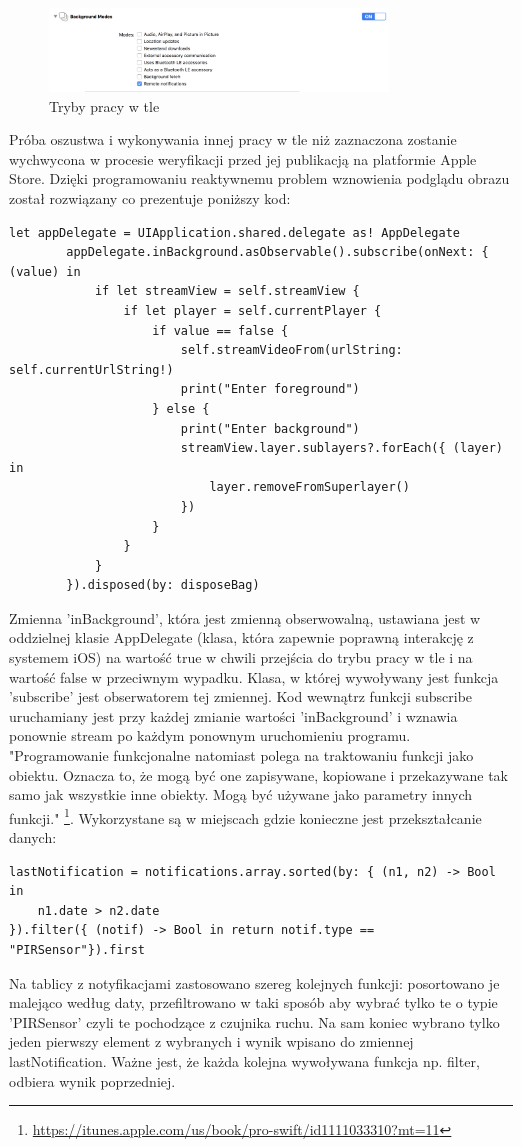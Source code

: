 \begin{figure}[ht]
	\centering
	\includegraphics[width=9cm]{ios_screenshots/backgroundModes.png}
	\caption{Tryby pracy w tle}
\end{figure}
Próba oszustwa i wykonywania innej pracy w tle niż zaznaczona zostanie wychwycona w procesie weryfikacji przed jej publikacją na platformie Apple Store. Dzięki programowaniu reaktywnemu problem wznowienia podglądu obrazu został rozwiązany co prezentuje poniższy kod:
\begin{verbatim}
let appDelegate = UIApplication.shared.delegate as! AppDelegate
        appDelegate.inBackground.asObservable().subscribe(onNext: { (value) in
            if let streamView = self.streamView {
                if let player = self.currentPlayer {
                    if value == false {
                        self.streamVideoFrom(urlString: self.currentUrlString!)
                        print("Enter foreground")
                    } else {
                        print("Enter background")
                        streamView.layer.sublayers?.forEach({ (layer) in
                            layer.removeFromSuperlayer()
                        })
                    }
                }
            }
        }).disposed(by: disposeBag)
\end{verbatim}
Zmienna 'inBackground', która jest zmienną obserwowalną, ustawiana jest w oddzielnej klasie AppDelegate (klasa, która zapewnie poprawną interakcję z systemem iOS) na wartość true w chwili przejścia do trybu pracy w tle i na wartość false w przeciwnym wypadku. Klasa, w której wywoływany jest funkcja 'subscribe' jest obserwatorem tej zmiennej. Kod wewnątrz funkcji subscribe uruchamiany jest przy każdej zmianie wartości 'inBackground' i wznawia ponownie stream po każdym ponownym uruchomieniu programu.
"Programowanie funkcjonalne natomiast polega na traktowaniu funkcji jako obiektu. Oznacza to, że mogą być one zapisywane, kopiowane i przekazywane tak samo jak wszystkie inne obiekty. Mogą być używane jako parametry innych funkcji." \footnote{\url{https://itunes.apple.com/us/book/pro-swift/id1111033310?mt=11}}. Wykorzystane są w miejscach gdzie konieczne jest przekształcanie danych:
\begin{verbatim}
lastNotification = notifications.array.sorted(by: { (n1, n2) -> Bool in
	n1.date > n2.date 
}).filter({ (notif) -> Bool in return notif.type == "PIRSensor"}).first
\end{verbatim}
Na tablicy z notyfikacjami zastosowano szereg kolejnych funkcji: posortowano je malejąco według daty, przefiltrowano w taki sposób aby wybrać tylko te o typie 'PIRSensor' czyli te pochodzące z czujnika ruchu. Na sam koniec wybrano tylko jeden pierwszy element z wybranych i wynik wpisano do zmiennej lastNotification. Ważne jest, że każda kolejna wywoływana funkcja np. filter, odbiera wynik poprzedniej. 

